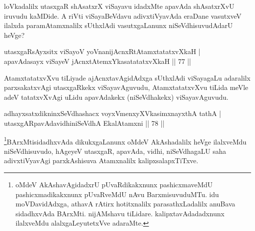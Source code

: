 \begin{artha}
loVkadalilx utasxgaR shAsatxrX viSayavu idadxMte apavAda shAsatxrXvU iruvudu kaMDide. A riVti viSayaBeVdavu adivxtiVyavAda  eraDane vasutxveV ilalxda paramAtamxnalilx sUthxlAdi vasutxgaLanunx niSeVdhisuvudAdarU heVge?
\end{artha}

\begin{shl}
utasxgaR\footnotemark[2]{}sAyxsitx viSayoV yoVnanijAcnxRtAtamxtatatxvXkaH |\\
apavAdasayx viSayeV jAcnxtAtemxYkasatatatxvXkaH \hfill || 77 ||
\end{shl}

\begin{artha}
AtamxtatatxvXvu tiLiyade ajAcnxtavAgidAdxga sUthxlAdi viSayagaLu adaralilx parxsakatxvAgi utasxgaRkekx viSayavAguvudu, AtamxtatatxvXvu tiLida meVle adeV tatatxvXvAgi uLidu apavAdakekx (niSeVdhakekx) viSayavAguvudu.
\end{artha}

\begin{shl}
adhayxsatxdikninxSeVdhashacx voyxVmenxyXVkasimxnayxthA tathA |\\
utasxgARpavAdavidhiniSeVdhA EkalAtamxni \hfill || 78 ||
\end{shl}

\begin{artha}%
\footnote[1]{oMdeV AkAshavAgidadxrU pUvaRdikakxnunx pashicxmaveMdU pashicxmadikakxnunx pUvaRveMdU nAvu BarxmisuvuduMTu. idu moVDavidAdxga, athavA rAtirx hotitxnalilx parasathxLadalilx anuBava sidadhxvAda BArxMti. nijAMshavu tiLidare. kalipxtavAdadadxnunx ilalxveMdu alalxgaLeyutetxVve adaraMte.}BArxMtisidadhxvAda dikukxgaLanunx oMdeV AkAshadalilx heVge ilalxveMdu niSeVdhisuvudo, hAgeyeV utasxgaR, apavAda, vidhi, niSeVdhagaLU saha adivxtiVyavAgi parxkAshisuva Atamxnalilx kalipxsalapxTiTxve.
\end{artha}


